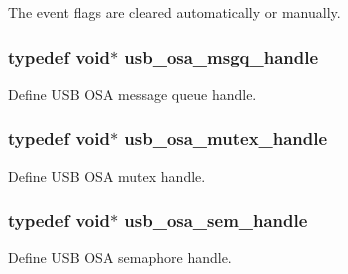 The event flags are cleared automatically or manually. 

\hypertarget{group__usb__os__abstraction_gab3a9f26ba50f3abea7fcbac07500cbb8}{
\subsubsection[{usb\-\_\-osa\-\_\-msgq\-\_\-handle}]{\setlength{\rightskip}{0pt plus 5cm}typedef void$\ast$ {\bf usb\-\_\-osa\-\_\-msgq\-\_\-handle}}}\label{group__usb__os__abstraction_gab3a9f26ba50f3abea7fcbac07500cbb8}


Define U\-S\-B O\-S\-A message queue handle. 

\hypertarget{group__usb__os__abstraction_gad259d0dfe125b11cccaf93163ef915fd}{
\subsubsection[{usb\-\_\-osa\-\_\-mutex\-\_\-handle}]{\setlength{\rightskip}{0pt plus 5cm}typedef void$\ast$ {\bf usb\-\_\-osa\-\_\-mutex\-\_\-handle}}}\label{group__usb__os__abstraction_gad259d0dfe125b11cccaf93163ef915fd}


Define U\-S\-B O\-S\-A mutex handle. 

\hypertarget{group__usb__os__abstraction_ga9f0e38944e1320d10c45eaacb67185b7}{
\subsubsection[{usb\-\_\-osa\-\_\-sem\-\_\-handle}]{\setlength{\rightskip}{0pt plus 5cm}typedef void$\ast$ {\bf usb\-\_\-osa\-\_\-sem\-\_\-handle}}}\label{group__usb__os__abstraction_ga9f0e38944e1320d10c45eaacb67185b7}


Define U\-S\-B O\-S\-A semaphore handle. 

